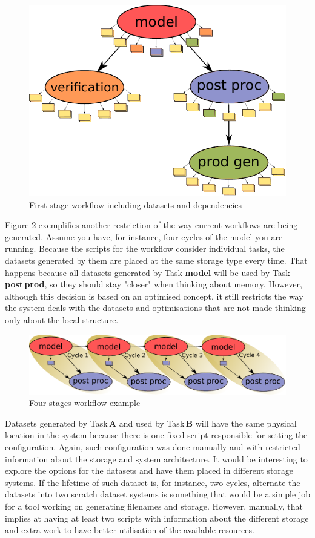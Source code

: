 \documentclass[a4paper]{article}
\begin{document}
\begin{figure}[H]
  \centering
  \includegraphics[width=0.6\columnwidth]{cycle-io-dep}
  \caption{First stage workflow including datasets and dependencies}
  \label{fig:cycle-io-dep}
\end{figure}

Figure \ref{fig:cycle-4} exemplifies another restriction of the way current workflows are being generated. Assume you have, for instance, four cycles of the model you are running. Because the scripts for the workflow consider individual tasks, the datasets generated by them are placed at the same storage type every time. That happens because all datasets generated by Task \textbf{model} will be used by Task \textbf{post\,prod}, so they should stay "closer" when thinking about memory. However, although this decision is based on an optimised concept, it still restricts the way the system deals with the datasets and optimisations that are not made thinking only about the local structure.

\begin{figure}[H]
  \centering
  \includegraphics[width=0.8\columnwidth]{cycle-4}
  \caption{Four stages workflow example}
  \label{fig:cycle-4}
\end{figure}

Datasets generated by Task\,\textbf{A} and used by Task\,\textbf{B} will have the same physical location in the system because there is one fixed script responsible for setting the configuration. Again, such configuration was done manually and with restricted information about the storage and system architecture. It would be interesting to explore the options for the datasets and have them placed in different storage systems. If the lifetime of such dataset is, for instance, two cycles, alternate the datasets into two scratch dataset systems is something that would be a simple job for a tool working on generating filenames and storage. However, manually, that implies at having at least two scripts with information about the different storage and extra work to have better utilisation of the available resources.
\end{document}
